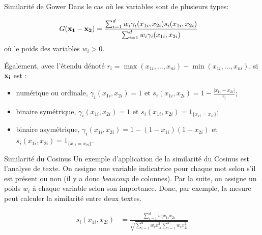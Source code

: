 \documentclass[10pt, french]{article}
\begin{document}
\begin{multicols*}{3}
\begin{conceptgen}{Similarité de Gower}
Dans le cas où les variables sont de plusieurs types:
\setlength{\mathindent}{-1cm}

\begin{align*}
	G(\mathbf{x_{1} - x_{2}})
	&=	\frac{\sum_{i = 1}^{d} w_{i} \gamma_{i} (x_{1i}, x_{2i}) s_{i}(x_{1i}, x_{2i})}{\sum_{i = 1}^{d} w_{i} \gamma_{i} (x_{1i}, x_{2i})}
\end{align*}
\setlength{\mathindent}{1cm}
où le poids des variables $w_{i} > 0$.

Également, avec l'étendu dénoté $r_{i} = \max(x_{1i}, \dots, x_{ni}) - \min(x_{1i}, \dots, x_{ni})$, si $\mathbf{x_{i}}$ est :

\begin{itemize}[leftmargin = *]
	\item	numérique ou ordinale, $\gamma_{i} (x_{1i}, x_{2i}) = 1$ et  $s_{i}(x_{1i}, x_{2i}) = 1 - \frac{|x_{1i} - x_{2i}|}{r_{i}}$;
	\item	binaire symétrique, $\gamma_{i} (x_{1i}, x_{2i}) = 1$ et  $s_{i}(x_{1i}, x_{2i}) = 1_{\{x_{1i} = x_{2i}\}}$;
	\item	binaire asymétrique, $\gamma_{i} (x_{1i}, x_{2i}) = 1 - (1 - x_{1i})(1 - x_{2i})$ et  $s_{i}(x_{1i}, x_{2i}) = 1_{\{x_{1i} = x_{2i}\}}$.
\end{itemize}
\end{conceptgen}

\begin{conceptgen}{Similarité du Cosinus}
Un exemple d'application de la similarité du Cosinus est l'analyse de texte. On assigne une variable indicatrice pour chaque mot selon s'il est présent ou non (il y a donc \textit{beaucoup} de colonnes). Par la suite, on assigne un poids $w_i$ à chaque variable selon son importance. Donc, par exemple, la mesure peut calculer la similarité entre deux textes.

\begin{align*}
	s_{i}(x_{1i}, x_{2i}) 
	&=	\frac{\sum_{i = 1}^{d} w_{i} x_{1i} x_{2i}}{\sqrt{\sum_{i = 1}^{d}w_{i}x_{1i}^{2}\sum_{i = 1}^{d} w_{i} x_{2i}^{2}}}
\end{align*}
\end{conceptgen}



\end{multicols*}
\end{document}
